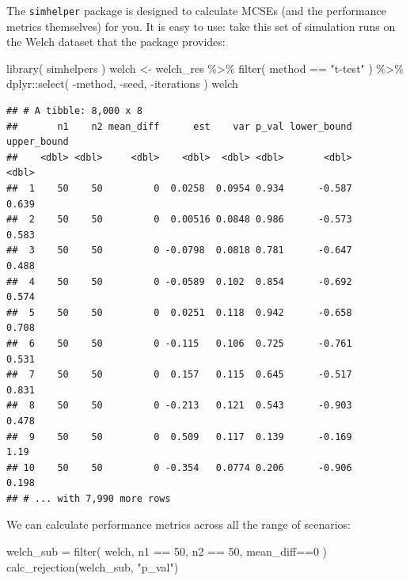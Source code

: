 \documentclass[
]{book}
\newenvironment{Shaded}{\begin{snugshade}}{\end{snugshade}}
\newcommand{\DecValTok}[1]{\textcolor[rgb]{0.00,0.00,0.81}{#1}}
\newcommand{\FunctionTok}[1]{\textcolor[rgb]{0.00,0.00,0.00}{#1}}
\newcommand{\NormalTok}[1]{#1}
\newcommand{\OtherTok}[1]{\textcolor[rgb]{0.56,0.35,0.01}{#1}}
\newcommand{\SpecialCharTok}[1]{\textcolor[rgb]{0.00,0.00,0.00}{#1}}
\newcommand{\StringTok}[1]{\textcolor[rgb]{0.31,0.60,0.02}{#1}}
\begin{document}
The \texttt{simhelper} package is designed to calculate MCSEs (and the performance metrics themselves) for you.
It is easy to use: take this set of simulation runs on the Welch dataset that the package provides:

\begin{Shaded}
\begin{Highlighting}[]
\FunctionTok{library}\NormalTok{( simhelpers )}
\NormalTok{welch }\OtherTok{\textless{}{-}}\NormalTok{ welch\_res }\SpecialCharTok{\%\textgreater{}\%}
  \FunctionTok{filter}\NormalTok{( method }\SpecialCharTok{==} \StringTok{"t{-}test"}\NormalTok{ ) }\SpecialCharTok{\%\textgreater{}\%}
\NormalTok{  dplyr}\SpecialCharTok{::}\FunctionTok{select}\NormalTok{( }\SpecialCharTok{{-}}\NormalTok{method, }\SpecialCharTok{{-}}\NormalTok{seed, }\SpecialCharTok{{-}}\NormalTok{iterations )}
\NormalTok{welch}
\end{Highlighting}
\end{Shaded}

\begin{verbatim}
## # A tibble: 8,000 x 8
##       n1    n2 mean_diff      est    var p_val lower_bound upper_bound
##    <dbl> <dbl>     <dbl>    <dbl>  <dbl> <dbl>       <dbl>       <dbl>
##  1    50    50         0  0.0258  0.0954 0.934      -0.587       0.639
##  2    50    50         0  0.00516 0.0848 0.986      -0.573       0.583
##  3    50    50         0 -0.0798  0.0818 0.781      -0.647       0.488
##  4    50    50         0 -0.0589  0.102  0.854      -0.692       0.574
##  5    50    50         0  0.0251  0.118  0.942      -0.658       0.708
##  6    50    50         0 -0.115   0.106  0.725      -0.761       0.531
##  7    50    50         0  0.157   0.115  0.645      -0.517       0.831
##  8    50    50         0 -0.213   0.121  0.543      -0.903       0.478
##  9    50    50         0  0.509   0.117  0.139      -0.169       1.19 
## 10    50    50         0 -0.354   0.0774 0.206      -0.906       0.198
## # ... with 7,990 more rows
\end{verbatim}

We can calculate performance metrics across all the range of scenarios:

\begin{Shaded}
\begin{Highlighting}[]
\NormalTok{welch\_sub }\OtherTok{=} \FunctionTok{filter}\NormalTok{( welch, n1 }\SpecialCharTok{==} \DecValTok{50}\NormalTok{, n2 }\SpecialCharTok{==} \DecValTok{50}\NormalTok{, mean\_diff}\SpecialCharTok{==}\DecValTok{0}\NormalTok{ )}
\FunctionTok{calc\_rejection}\NormalTok{(welch\_sub, }\StringTok{"p\_val"}\NormalTok{)}
\end{Highlighting}
\end{Shaded}
\end{document}
